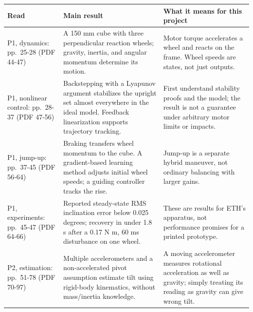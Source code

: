 \documentclass[
]{article}
\newcounter{none} %
\begin{document}
{\def\LTcaptype{none} %
\begin{longtable}[]{@{}
  >{\raggedright\arraybackslash}p{}
  >{\raggedright\arraybackslash}p{}
  >{\raggedright\arraybackslash}p{}@{}}
\toprule\noalign{}
\begin{minipage}[b]{\linewidth}\raggedright
Read
\end{minipage} & \begin{minipage}[b]{\linewidth}\raggedright
Main result
\end{minipage} & \begin{minipage}[b]{\linewidth}\raggedright
What it means for this project
\end{minipage} \\
\midrule\noalign{}
\endhead
\bottomrule\noalign{}
\endlastfoot
P1, dynamics: pp.~25-28 (PDF 44-47) & A 150 mm cube with three
perpendicular reaction wheels; gravity, inertia, and angular momentum
determine its motion. & Motor torque accelerates a wheel and reacts on
the frame. Wheel speeds are states, not just outputs. \\
P1, nonlinear control: pp.~28-37 (PDF 47-56) & Backstepping with a
Lyapunov argument stabilizes the upright set almost everywhere in the
ideal model. Feedback linearization supports trajectory tracking. &
First understand stability proofs and the model; the result is not a
guarantee under arbitrary motor limits or impacts. \\
P1, jump-up: pp.~37-45 (PDF 56-64) & Braking transfers wheel momentum to
the cube. A gradient-based learning method adjusts initial wheel speeds;
a guiding controller tracks the rise. & Jump-up is a separate hybrid
maneuver, not ordinary balancing with larger gains. \\
P1, experiments: pp.~45-47 (PDF 64-66) & Reported steady-state RMS
inclination error below 0.025 degrees; recovery in under 1.8 s after a
0.17 N m, 60 ms disturbance on one wheel. & These are results for ETH's
apparatus, not performance promises for a printed prototype. \\
P2, estimation: pp.~51-78 (PDF 70-97) & Multiple accelerometers and a
non-accelerated pivot assumption estimate tilt using rigid-body
kinematics, without mass/inertia knowledge. & A moving accelerometer
measures rotational acceleration as well as gravity; simply treating its
reading as gravity can give wrong tilt. \\
\end{longtable}
}
\end{document}

